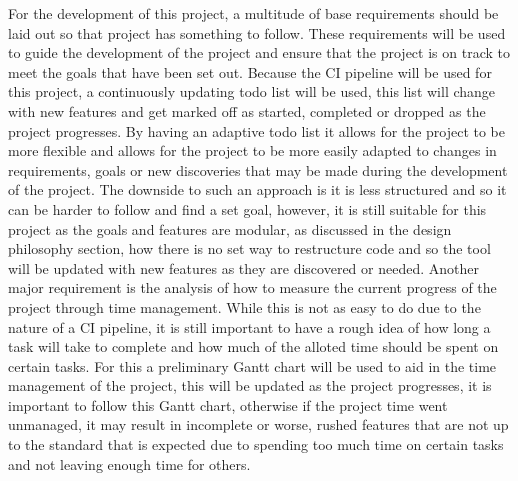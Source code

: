 For the development of this project, a multitude of base requirements should be laid out so that project has something to follow. These requirements will be used to guide the development of the project and ensure that the project is on track to meet the goals that have been set out.
Because the CI pipeline will be used for this project, a continuously updating todo list will be used, this list will change with new features and get marked off as started, completed or dropped as the project progresses. By having an adaptive todo list it allows for the project to be more flexible and allows for the project to be more easily adapted to changes in requirements, goals or new discoveries that may be made during the development of the project. The downside to such an approach is it is less structured and so it can be harder to follow and find a set goal, however, it is still suitable for this project as the goals and features are modular, as discussed in the design philosophy section, how there is no set way to restructure code and so the tool will be updated with new features as they are discovered or needed.
Another major requirement is the analysis of how to measure the current progress of the project through time management. While this is not as easy to do due to the nature of a CI pipeline, it is still important to have a rough idea of how long a task will take to complete and how much of the alloted time should be spent on certain tasks. For this a preliminary Gantt chart will be used to aid in the time management of the project, this will be updated as the project progresses, it is important to follow this Gantt chart, otherwise if the project time went unmanaged, it may result in incomplete or worse, rushed features that are not up to the standard that is expected due to spending too much time on certain tasks and not leaving enough time for others.

